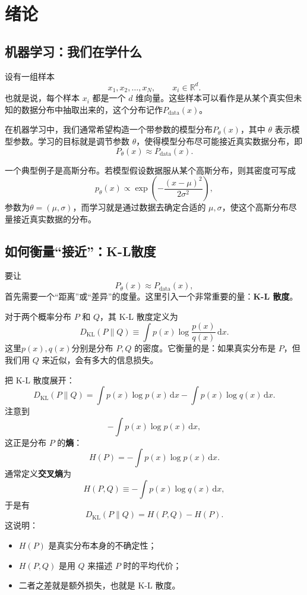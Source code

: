 \newpage
\chapter{绪论}
\section{机器学习：我们在学什么}

设有一组样本
\[
x_1,x_2,\dots,x_N,\qquad x_i\in\mathbb{R}^d.
\]
也就是说，每个样本 \(x_i\) 都是一个 \(d\) 维向量。这些样本可以看作是从某个真实但未知的数据分布中抽取出来的，这个分布记作\(P_{\mathrm{data}}(x)\)。

在机器学习中，我们通常希望构造一个带参数的模型分布\(P_\theta(x)\)，其中 \(\theta\) 表示模型参数。学习的目标就是调节参数 \(\theta\)，使得模型分布尽可能接近真实数据分布，即
\[
P_\theta(x)\approx P_{\mathrm{data}}(x).
\]

一个典型例子是高斯分布。若模型假设数据服从某个高斯分布，则其密度可写成
\[
p_\theta(x)\propto \exp\left(-\frac{(x-\mu)^2}{2\sigma^2}\right),
\]
参数为\(\theta=(\mu,\sigma)\)，而学习就是通过数据去确定合适的 \(\mu,\sigma\)，使这个高斯分布尽量接近真实数据的分布。

\section{如何衡量``接近''：K-L散度}

要让
\[
P_\theta(x)\approx P_{\mathrm{data}}(x),
\]
首先需要一个``距离''或``差异''的度量。这里引入一个非常重要的量：\textbf{K-L 散度}。

对于两个概率分布 \(P\) 和 \(Q\)，其 K-L 散度定义为
\[
D_{\mathrm{KL}}(P\|Q)\equiv\int p(x)\log\frac{p(x)}{q(x)}\,\mathrm{d}x.
\]
这里\(p(x),q(x)\)分别是分布 \(P,Q\) 的密度。它衡量的是：如果真实分布是 \(P\)，但我们用 \(Q\) 来近似，会有多大的信息损失。

把 K-L 散度展开：
\[
D_{\mathrm{KL}}(P\|Q)
=
\int p(x)\log p(x)\,\mathrm{d}x
-
\int p(x)\log q(x)\,\mathrm{d}x.
\]
注意到
\[
-\int p(x)\log p(x)\,\mathrm{d}x,
\]
这正是分布 \(P\) 的\textbf{熵}：
\[
H(P)=-\int p(x)\log p(x)\,\mathrm{d}x.
\]
通常定义\textbf{交叉熵}为
\[
H(P,Q)\equiv-\int p(x)\log q(x)\,\mathrm{d}x,
\]
于是有
\[
D_{\mathrm{KL}}(P\|Q)=H(P,Q)-H(P).
\]
这说明：
\begin{itemize}
    \item \(H(P)\) 是真实分布本身的不确定性；
    \item \(H(P,Q)\) 是用 \(Q\) 来描述 \(P\) 时的平均代价；
    \item 二者之差就是额外损失，也就是 K-L 散度。
\end{itemize}

